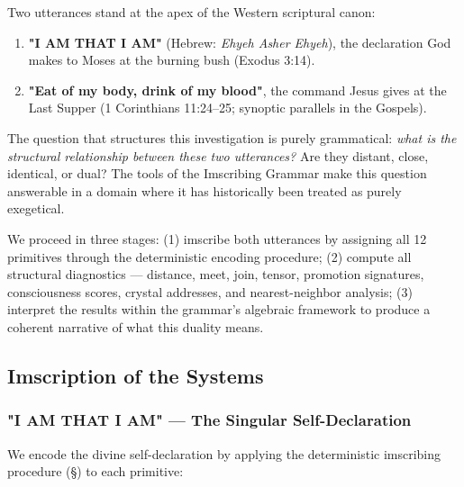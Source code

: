 \documentclass[12pt,a4paper]{article}
\newcommand{\pilcrow}{\S}
\begin{document}
Two utterances stand at the apex of the Western scriptural canon:

\begin{enumerate}
    \item \textbf{"I AM THAT I AM"} (Hebrew: \emph{Ehyeh Asher Ehyeh}), the declaration God makes to Moses at the burning bush (Exodus 3:14).
    \item \textbf{"Eat of my body, drink of my blood"}, the command Jesus gives at the Last Supper (1 Corinthians 11:24--25; synoptic parallels in the Gospels).
\end{enumerate}

The question that structures this investigation is purely grammatical: \emph{what is the structural relationship between these two utterances?} Are they distant, close, identical, or dual? The tools of the Imscribing Grammar make this question answerable in a domain where it has historically been treated as purely exegetical.

We proceed in three stages: (1) imscribe both utterances by assigning all 12 primitives through the deterministic encoding procedure; (2) compute all structural diagnostics --- distance, meet, join, tensor, promotion signatures, consciousness scores, crystal addresses, and nearest-neighbor analysis; (3) interpret the results within the grammar's algebraic framework to produce a coherent narrative of what this duality means.

\subsection{Imscription of the Systems}

\subsubsection{"I AM THAT I AM" --- The Singular Self-Declaration}

We encode the divine self-declaration by applying the deterministic imscribing procedure (\pilcrow{}) to each primitive:
\end{document}

